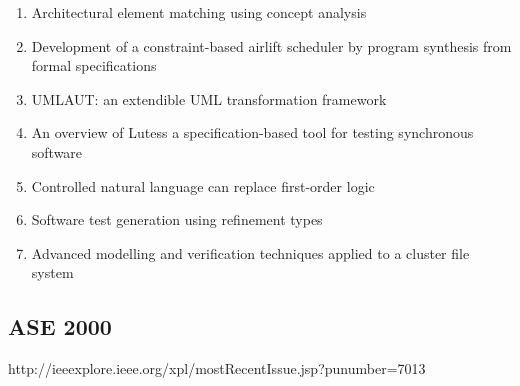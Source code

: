 \begin{enumerate}[itemsep=-1ex]
  \item Architectural element matching using concept analysis
  \item Development of a constraint-based airlift scheduler by program synthesis from formal specifications
  \item UMLAUT: an extendible UML transformation framework
  \item An overview of Lutess a specification-based tool for testing synchronous software
  \item Controlled natural language can replace first-order logic
  \item Software test generation using refinement types
  \item Advanced modelling and verification techniques applied to a cluster file system 
\end{enumerate}

\subsection{ASE 2000}

http://ieeexplore.ieee.org/xpl/mostRecentIssue.jsp?punumber=7013

